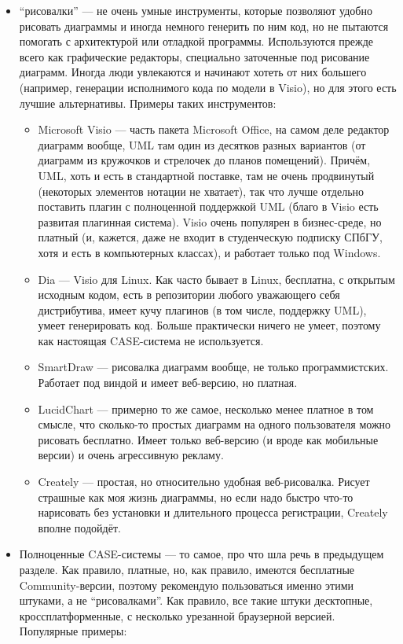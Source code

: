 \documentclass[a5paper]{article}
\begin{document}
\begin{itemize}
    \item ``рисовалки'' --- не очень умные инструменты, которые позволяют удобно рисовать диаграммы и иногда немного генерить по ним код, но не пытаются помогать с архитектурой или отладкой программы. Используются прежде всего как графические редакторы, специально заточенные под рисование диаграмм. Иногда люди увлекаются и начинают хотеть от них большего (например, генерации исполнимого кода по модели в Visio), но для этого есть лучшие альтернативы. Примеры таких инструментов:
    \begin{itemize}
        \item Microsoft Visio --- часть пакета Microsoft Office, на самом деле редактор диаграмм вообще, UML там один из десятков разных вариантов (от диаграмм из кружочков и стрелочек до планов помещений). Причём, UML, хоть и есть в стандартной поставке, там не очень продвинутый (некоторых элементов нотации не хватает), так что лучше отдельно поставить плагин с полноценной поддержкой UML (благо в Visio есть развитая плагинная система). Visio очень популярен в бизнес-среде, но платный (и, кажется, даже не входит в студенческую подписку СПбГУ, хотя и есть в компьютерных классах), и работает только под Windows.
        \item Dia --- Visio для Linux. Как часто бывает в Linux, бесплатна, с открытым исходным кодом, есть в репозитории любого уважающего себя дистрибутива, имеет кучу плагинов (в том числе, поддержку UML), умеет генерировать код. Больше практически ничего не умеет, поэтому как настоящая CASE-система не используется.
        \item SmartDraw --- рисовалка диаграмм вообще, не только программистских. Работает под виндой и имеет веб-версию, но платная.
        \item LucidChart --- примерно то же самое, несколько менее платное в том смысле, что сколько-то простых диаграмм на одного пользователя можно рисовать бесплатно. Имеет только веб-версию (и вроде как мобильные версии) и очень агрессивную рекламу.
        \item Creately --- простая, но относительно удобная веб-рисовалка. Рисует страшные как моя жизнь диаграммы, но если надо быстро что-то нарисовать без установки и длительного процесса регистрации, Creately вполне подойдёт.
    \end{itemize}
    \item Полноценные CASE-системы --- то самое, про что шла речь в предыдущем разделе. Как правило, платные, но, как правило, имеются бесплатные Community-версии, поэтому рекомендую пользоваться именно этими штуками, а не ``рисовалками''. Как правило, все такие штуки десктопные, кроссплатформенные, с несколько урезанной браузерной версией. Популярные примеры:

\end{itemize}
\end{document}

